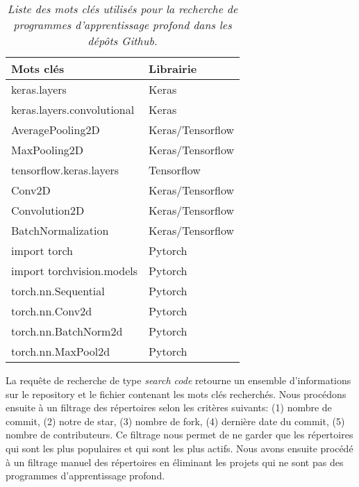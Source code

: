 \begin{table}[h]
  \centering
  \caption{\emph{Liste des mots clés utilisés pour la recherche de programmes d'apprentissage profond dans les dépôts Github.}}
  \label{tab:keywords}
  \begin{tabular}{|l|l|}
    \hline
    \textbf{Mots clés}         & \textbf{Librairie} \\ \hline
    keras.layers               & Keras              \\ \hline
    keras.layers.convolutional & Keras              \\ \hline
    AveragePooling2D           & Keras/Tensorflow   \\ \hline
    MaxPooling2D               & Keras/Tensorflow   \\ \hline
    tensorflow.keras.layers    & Tensorflow         \\ \hline
    Conv2D                     & Keras/Tensorflow   \\ \hline
    Convolution2D              & Keras/Tensorflow   \\ \hline
    BatchNormalization         & Keras/Tensorflow   \\ \hline
    import torch               & Pytorch            \\ \hline
    import torchvision.models  & Pytorch            \\ \hline
    torch.nn.Sequential        & Pytorch            \\ \hline
    torch.nn.Conv2d            & Pytorch            \\ \hline
    torch.nn.BatchNorm2d       & Pytorch            \\ \hline
    torch.nn.MaxPool2d         & Pytorch            \\ \hline
  \end{tabular}
\end{table}


La requête de recherche de type \emph{search code} retourne un ensemble d'informations sur le repository et le fichier contenant les mots clés recherchés.
Nous procédons ensuite à un filtrage des répertoires selon les critères
suivants: (1) nombre de commit, (2) notre de star, (3) nombre de fork, (4) dernière date du
commit, (5) nombre de contributeurs. Ce filtrage nous permet de ne garder que
les répertoires qui sont les plus populaires et qui sont les plus actifs. Nous
avons ensuite procédé à un filtrage manuel des répertoires en éliminant les
projets qui ne sont pas des programmes d'apprentissage profond.








